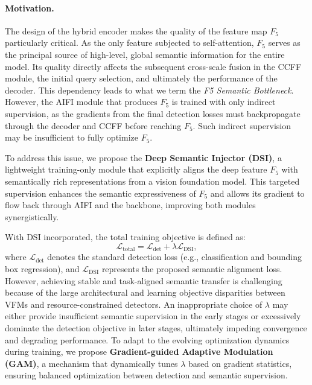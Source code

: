 \paragraph{Motivation.}
The design of the hybrid encoder makes the quality of the feature map $F_5$ particularly critical. 
As the only feature subjected to self-attention, $F_5$ serves as the principal source of high-level, global semantic information for the entire model. Its quality directly affects the subsequent cross-scale fusion in the CCFF module, the initial query selection, and ultimately the performance of the decoder. 
This dependency leads to what we term the \textit{F5 Semantic Bottleneck}. However, the AIFI module that produces $F_5$ is trained with only indirect supervision, as the gradients from the final detection losses must backpropagate through the decoder and CCFF before reaching $F_5$. Such indirect supervision may be insufficient to fully optimize $F_5$.

To address this issue, we propose the \textbf{Deep Semantic Injector (DSI)}, a lightweight training-only module that explicitly aligns the deep feature $F_5$ with semantically rich representations from a vision foundation model.
This targeted supervision enhances the semantic expressiveness of $F_5$ and allows its gradient to flow back through AIFI and the backbone, improving both modules synergistically.

With DSI incorporated, the total training objective is defined as:
\begin{equation}
\mathcal{L}_{\text{total}} = \mathcal{L}_{\text{det}} + \lambda \mathcal{L}_{\text{DSI}},
\label{eq:loss_all}
\end{equation}
where $\mathcal{L}_{\text{det}}$ denotes the standard detection loss (e.g., classification and bounding box regression), and $\mathcal{L}_{\text{DSI}}$ represents the proposed semantic alignment loss.
However, achieving stable and task-aligned semantic transfer is challenging because of the large architectural and learning objective disparities between VFMs and resource-constrained detectors.
An inappropriate choice of $\lambda$ may either provide insufficient semantic supervision in the early stages or excessively dominate the detection objective in later stages, ultimately impeding convergence and degrading performance.
To adapt to the evolving optimization dynamics during training, we propose \textbf{Gradient-guided Adaptive Modulation (GAM)}, a mechanism that dynamically tunes $\lambda$ based on gradient statistics, ensuring balanced optimization between detection and semantic supervision.


